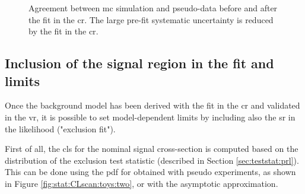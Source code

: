 \begin{itemize}
\begin{figure}[h]
\centering 
{}
\caption{
Agreement between \gls{mc} simulation and pseudo-data  before and  after the fit in the \gls{cr}. The large pre-fit systematic uncertainty is reduced by the fit in the \gls{cr}.
}
\label{fig:stat:VRunc}
\end{figure}

\end{itemize}


\subsection{Inclusion of the signal region in the fit and limits}
\label{sec:stat:example:limits}

Once the background model has been derived with the fit in the \gls{cr} and validated in the \gls{vr}, 
it is possible to set model-dependent limits by including also the \gls{sr} in the likelihood ("exclusion fit").

First of all, the \gls{cls} for the nominal signal cross-section is computed based on the distribution of the exclusion test statistic \qmu 
(described in Section \ref{sec:teststat:prl}). This can be done using the \gls{pdf} for \qmu obtained with pseudo experiments, as shown in 
Figure \ref{fig:stat:CLscan:toys:two}, or with the asymptotic approximation.


